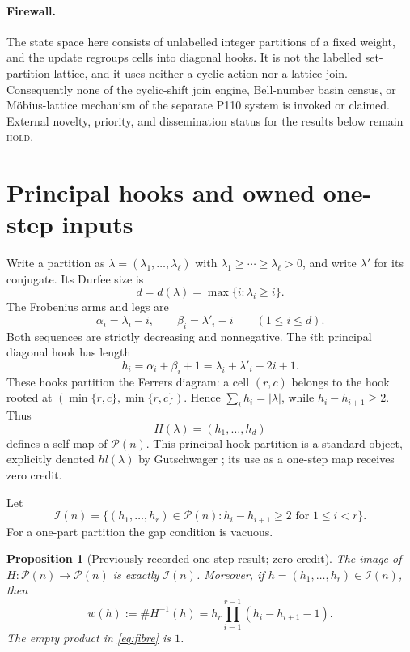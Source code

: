 \documentclass[10pt]{amsart}
\newtheorem{proposition}[theorem]{Proposition}
\theoremstyle{definition}
\newcommand{\Par}{\mathcal P}
\newcommand{\Img}{\mathcal I}
\newcommand{\ellp}{\ell}
\begin{document}
\paragraph{Firewall.}
The state space here consists of unlabelled integer partitions of a fixed
weight, and the update regroups cells into diagonal hooks.  It is not the
labelled set-partition lattice, and it uses neither a cyclic action nor a
lattice join.  Consequently none of the cyclic-shift join engine, Bell-number
basin census, or M\"obius-lattice mechanism of the separate P110 system is
invoked or claimed.  External novelty, priority, and dissemination status for
the results below remain \textsc{hold}.

\section{Principal hooks and owned one-step inputs}

Write a partition as
$\lambda=(\lambda _1,\ldots,\lambda _{\ellp})$ with
$\lambda_1\geq\cdots\geq\lambda_{\ellp}>0$, and write $\lambda'$ for its
conjugate.  Its Durfee size is
\[
 d=d(\lambda)=\max\{i:\lambda_i\geq i\}.
\]
The Frobenius arms and legs are
\[
 \alpha_i=\lambda_i-i,
 \qquad
 \beta_i=\lambda'_i-i
 \qquad(1\leq i\leq d).
\]
Both sequences are strictly decreasing and nonnegative.  The $i$th principal
diagonal hook has length
\[
 h_i=\alpha_i+\beta_i+1
     =\lambda_i+\lambda'_i-2i+1.
\]
These hooks partition the Ferrers diagram: a cell $(r,c)$ belongs to the hook
rooted at $(\min\{r,c\},\min\{r,c\})$.  Hence $\sum_i h_i=|\lambda|$, while
$h_i-h_{i+1}\geq2$.  Thus
\[
 H(\lambda)=(h_1,\ldots,h_d)
\]
defines a self-map of $\Par(n)$.  This principal-hook partition is a standard
object, explicitly denoted $hl(\lambda)$ by Gutschwager
\cite{Gutschwager2011}; its use as a one-step map receives zero credit.

Let
\[
 \Img(n)=\{(h_1,\ldots,h_r)\in\Par(n):
               h_i-h_{i+1}\geq2\text{ for }1\leq i<r\}.
\]
For a one-part partition the gap condition is vacuous.

\begin{proposition}[Previously recorded one-step result; zero credit]
\label{prop:classical}
The image of $H:\Par(n)\to\Par(n)$ is exactly $\Img(n)$.  Moreover, if
$h=(h_1,\ldots,h_r)\in\Img(n)$, then
\begin{equation}
 \label{eq:fibre}
 w(h):=\#H^{-1}(h)
 =h_r\prod_{i=1}^{r-1}(h_i-h_{i+1}-1).
\end{equation}
The empty product in \eqref{eq:fibre} is $1$.
\end{proposition}
\end{document}
